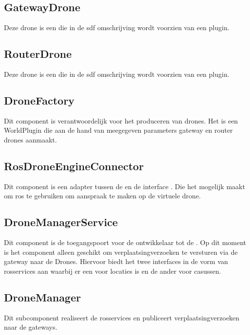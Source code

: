 \documentclass[a4paper, 11pt, oneside]{report}
\begin{document}
\subsection{GatewayDrone}
\label{architectural:subcomponenten:GatewayDrone}
Deze drone is een  die in de sdf omschrijving wordt voorzien van een  plugin. 
\subsection{RouterDrone}
\label{architectural:subcomponenten:RouterDrone}
Deze drone is een  die in de sdf omschrijving wordt voorzien van een  plugin. 

\subsection{DroneFactory}
\label{architectural:subcomponenten:DroneFactory}
Dit component is verantwoordelijk voor het produceren van drones. Het is een WorldPlugin die aan de hand van meegegeven parameters gateway en router drones aanmaakt.  

\subsection{RosDroneEngineConnector}
\label{architectural:subcomponenten:RosDroneEngineConnector}
Dit component is een adapter tussen de  en de interface . Die het mogelijk maakt om ros te gebruiken om aanspraak te maken op de virtuele drone.

\subsection{DroneManagerService}
\label{architectural:subcomponenten:DroneManagerService}
Dit component is de toegangspoort voor de ontwikkelaar tot de .
Op dit moment is het component alleen geschikt om verplaatsingverzoeken te versturen via de gateway naar de Drones.
Hiervoor biedt het twee interfaces in de vorm van rosservices aan waarbij er een voor locaties is en de ander voor casussen. 

\subsection{DroneManager}
\label{architectural:subcomponenten:DroneManager}
Dit subcomponent realiseert de rosservices en publiceert verplaatsingverzoeken naar de gateways.  
\end{document}

